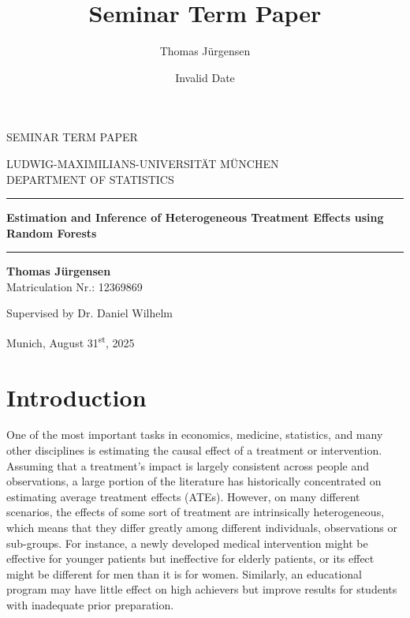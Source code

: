 \documentclass[
  12pt,
  a4paper,
  oneside]{article}
\title{Seminar Term Paper}
\author{Thomas Jürgensen}
\date{Invalid Date}
\renewcommand*\contentsname{Table of contents}
\newcommand\contentsname{Table of contents}
\renewcommand*\listfigurename{List of Figures}
\newcommand\listfigurename{List of Figures}
\renewcommand*\listtablename{List of Tables}
\newcommand\listtablename{List of Tables}
\begin{document}
\begin{titlepage}
\begin{center}

\Large
SEMINAR TERM PAPER

\vspace{0.5cm}
\Large
LUDWIG-MAXIMILIANS-UNIVERSITÄT MÜNCHEN\\
DEPARTMENT OF STATISTICS

\vspace{0.5cm}

\rule{\textwidth}{1.5pt}
\LARGE
\textbf{Estimation and Inference of Heterogeneous Treatment Effects using Random Forests}
\rule{\textwidth}{1.5pt}

\vspace{0.5cm}

\Large
\textbf{Thomas Jürgensen}\\
\large
Matriculation Nr.: 12369869

\vspace{0.5cm}

Supervised by Dr. Daniel Wilhelm

\vspace{0.5cm}

\large
Munich, August 31\textsuperscript{st}, 2025
      
\vspace{0.5cm}



\vfill

\end{center}
\end{titlepage}
\newpage
\newpage
\renewcommand*\contentsname{Contents}
\setcounter{tocdepth}{3}
\renewcommand*\listfigurename{List of figures}
\renewcommand*\listtablename{List of tables}

\tableofcontents

\newpage

\section{Introduction}\label{sec-intro}


One of the most important tasks in economics, medicine, statistics, and
many other disciplines is estimating the causal effect of a treatment or
intervention. Assuming that a treatment's impact is largely consistent
across people and observations, a large portion of the literature has
historically concentrated on estimating average treatment effects
(ATEs). However, on many different scenarios, the effects of some sort
of treatment are intrinsically heterogeneous, which means that they
differ greatly among different individuals, observations or sub-groups.
For instance, a newly developed medical intervention might be effective
for younger patients but ineffective for elderly patients, or its effect
might be different for men than it is for women. Similarly, an
educational program may have little effect on high achievers but improve
results for students with inadequate prior preparation.
\end{document}
